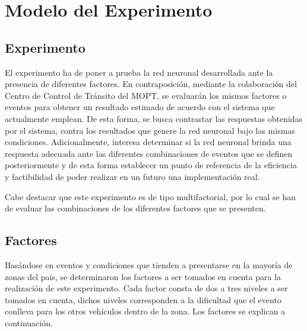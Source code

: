 \renewcommand\paragraph{\@startsection{paragraph}{4}{\z@}%
                                     {-3.25ex\@plus -1ex \@minus -.2ex}%
                                     {0.0001pt \@plus .2ex}%
                                     {\normalfont\normalsize\bfseries}}

\renewcommand\subparagraph{\@startsection{subparagraph}{5}{\z@}%
                                     {-3.25ex\@plus -1ex \@minus -.2ex}%
                                     {0.0001pt \@plus .2ex}%
                                     {\normalfont\normalsize\bfseries}}

\section{Modelo del Experimento}

\subsection{Experimento}
El experimento ha de poner a prueba la red neuronal desarrollada ante la presencia de diferentes factores. En contraposici\'{o}n, mediante la colaboraci\'{o}n del Centro de Control de Tr\'{a}nsito del MOPT, se evaluar\'{a}n los mismos factores o eventos para obtener un resultado estimado de acuerdo con el sistema que actualmente emplean. De esta forma, se busca contrastar las respuestas obtenidas por el sistema, contra los resultados que genere la red neuronal bajo las mismas condiciones. Adicionalmente, interesa determinar si la red neuronal brinda una respuesta adecuada ante las diferentes combinaciones de eventos que se definen posteriormente y de esta forma establecer un punto de referencia de la eficiencia y factibilidad de poder realizar en un futuro una implementaci\'{o}n real. 

Cabe destacar que este experimento es de tipo multifactorial, por lo cual se han de evaluar las combinaciones de los diferentes factores que se presenten.

\subsection{Factores}
Bas\'{a}ndose en eventos y condiciones que tienden a presentarse en la mayor\'{i}a de zonas del pa\'{i}s, se determinaron los factores a ser tomados en cuenta para la realizaci\'{o}n de este experimento. Cada factor consta de dos a tres niveles a ser tomados en cuenta, dichos niveles corresponden a la dificultad que el evento conlleva para los otros veh\'{i}culos dentro de la zona. Los factores se explican a continuaci\'{o}n.


